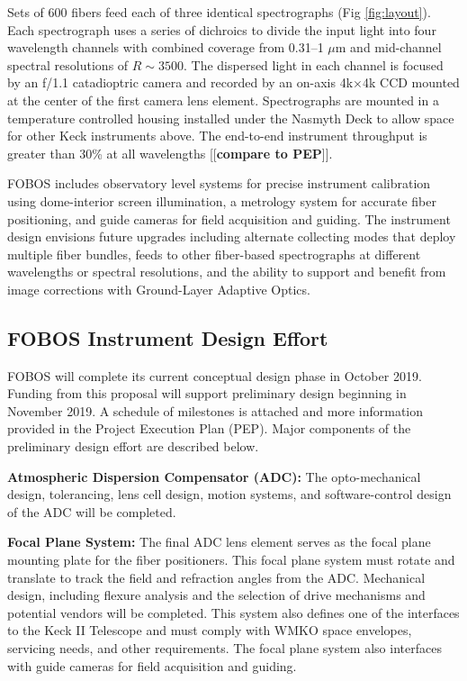 \documentclass[oneside,11pt]{amsart}
\newcommand{\comment}[2][todo]{{\color{#1}[[{\bf #2}]]}}
\begin{document}
Sets of 600 fibers feed each of three identical spectrographs (Fig
\ref{fig:layout}).  Each spectrograph uses a series of dichroics to
divide the input light into four wavelength channels with combined
coverage from 0.31--1 $\mu$m and mid-channel spectral resolutions of $R
\sim 3500$.  The dispersed light in each channel is focused by an f/1.1
catadioptric camera and recorded by an on-axis 4k$\times$4k CCD mounted
at the center of the first camera lens element.  Spectrographs are
mounted in a temperature controlled housing installed under the Nasmyth
Deck to allow space for other Keck instruments above.  The end-to-end
instrument throughput is greater than 30\% at all wavelengths
\comment{compare to PEP}.

FOBOS includes observatory level systems for precise instrument
calibration using dome-interior screen illumination, a metrology system
for accurate fiber positioning, and guide cameras for field acquisition
and guiding.  The instrument design envisions future upgrades including
alternate collecting modes that deploy multiple fiber bundles, feeds to
other fiber-based spectrographs at different wavelengths or spectral
resolutions, and the ability to support and benefit from image
corrections with Ground-Layer Adaptive Optics.

\subsection{FOBOS Instrument Design Effort}
\label{sec:design}

FOBOS will complete its current conceptual design phase in October 2019.
Funding from this proposal will support preliminary design beginning in
November 2019.  A schedule of milestones is attached and more
information provided in the Project Execution Plan (PEP).  Major
components of the preliminary design effort are described below.

\noindent \textbf{Atmospheric Dispersion Compensator (ADC):} The
opto-mechanical design, tolerancing, lens cell design, motion systems,
and software-control design of the ADC will be completed.  

\noindent \textbf{Focal Plane System:} The final ADC lens element serves
as the focal plane mounting plate for the fiber positioners.  This focal
plane system must rotate and translate to track the field and refraction
angles from the ADC.  Mechanical design, including flexure analysis and
the selection of drive mechanisms and potential vendors will be
completed.  This system also defines one of the interfaces to the Keck
II Telescope and must comply with WMKO space envelopes, servicing needs,
and other requirements.  The focal plane system also interfaces with
guide cameras for field acquisition and guiding.
\end{document}
